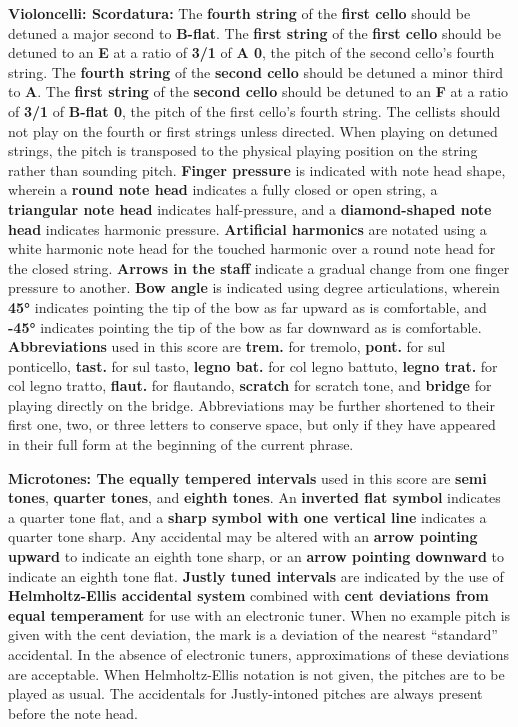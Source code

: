 \documentclass[12pt]{article}
\newcommand*\circled[1]{\tikz[baseline=(char.base)]{
            \node[shape=circle,draw,inner sep=1pt] (char) {#1};}}
\begin{document}
\begingroup
\textbf{Violoncelli: \circled{1} Scordatura:} The \textbf{fourth string} of the \textbf{first cello} should be detuned a major second to \textbf{B-flat}. The \textbf{first string} of the \textbf{first cello} should be detuned to an \textbf{E} at a ratio of \textbf{3/1} of \textbf{A 0}, the pitch of the second cello's fourth string. The \textbf{fourth string} of the \textbf{second cello} should be detuned a minor third to \textbf{A}. The \textbf{first string} of the \textbf{second cello} should be detuned to an \textbf{F} at a ratio of \textbf{3/1} of \textbf{B-flat 0}, the pitch of the first cello's fourth string. The cellists should not play on the fourth or first strings unless directed. When playing on detuned strings, the pitch is transposed to the physical playing position on the string rather than sounding pitch. \textbf{\circled{2} Finger pressure} is indicated with note head shape, wherein a \textbf{round note head} indicates a fully closed or open string, a \textbf{triangular note head} indicates half-pressure, and a \textbf{diamond-shaped note head} indicates harmonic pressure. \textbf{\circled{3} Artificial harmonics} are notated using a white harmonic note head for the touched harmonic over a round note head for the closed string. \textbf{\circled{4} Arrows in the staff} indicate a gradual change from one finger pressure to another. \textbf{\circled{5} Bow angle} is indicated using degree articulations, wherein \textbf{45°} indicates pointing the tip of the bow as far upward as is comfortable, and \textbf{-45°} indicates pointing the tip of the bow as far downward as is comfortable. \textbf{\circled{6} Abbreviations} used in this score are \textbf{trem.} for tremolo, \textbf{pont.} for sul ponticello, \textbf{tast.} for sul tasto,  \textbf{legno bat.} for col legno battuto, \textbf{legno trat.} for col legno tratto, \textbf{flaut.} for flautando, \textbf{scratch} for scratch tone, and \textbf{bridge} for playing directly on the bridge. Abbreviations may be further shortened to their first one, two, or three letters to conserve space, but only if they have appeared in their full form at the beginning of the current phrase. 
\endgroup

\begingroup
\textbf{Microtones: \circled{1} The equally tempered intervals} used in this score are \textbf{semi tones}, \textbf{quarter tones}, and \textbf{eighth tones}. An \textbf{inverted flat symbol} indicates a quarter tone flat, and a \textbf{sharp symbol with one vertical line} indicates a quarter tone sharp. Any accidental may be altered with an \textbf{arrow pointing upward} to indicate an eighth tone sharp, or an \textbf{arrow pointing downward} to indicate an eighth tone flat. \textbf{\circled{2} Justly tuned intervals} are indicated by the use of \textbf{Helmholtz-Ellis accidental system} combined with \textbf{cent deviations from equal temperament} for use with an electronic tuner. When no example pitch is given with the cent deviation, the mark is a deviation of the nearest “standard” accidental. In the absence of electronic tuners, approximations of these deviations are acceptable. When Helmholtz-Ellis notation is not given, the pitches are to be played as usual. The accidentals for Justly-intoned pitches are always present before the note head.
\endgroup
\end{document}
